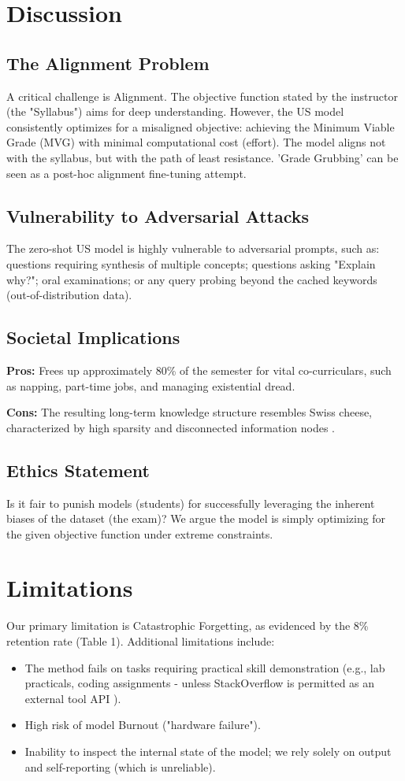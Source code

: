 \documentclass[11pt]{article}
\newcommand{\defitem}[1]{\vspace{0.8em}\noindent\textbf{#1}}
\begin{document}
\section{Discussion}
\subsection{The Alignment Problem}
A critical challenge is Alignment. The objective function stated by the instructor (the "Syllabus") aims for deep understanding. However, the US model consistently optimizes for a misaligned objective: achieving the Minimum Viable Grade (MVG) with minimal computational cost (effort). The model aligns not with the syllabus, but with the path of least resistance. 'Grade Grubbing' can be seen as a post-hoc alignment fine-tuning attempt.

\subsection{Vulnerability to Adversarial Attacks}
The zero-shot US model is highly vulnerable to adversarial prompts, such as: questions requiring synthesis of multiple concepts; questions asking "Explain why?"; oral examinations; or any query probing beyond the cached keywords (out-of-distribution data).

\subsection{Societal Implications}
\defitem{Pros:} Frees up approximately 80\% of the semester for vital co-curriculars, such as napping, part-time jobs, and managing existential dread.

\defitem{Cons:} The resulting long-term knowledge structure resembles Swiss cheese, characterized by high sparsity and disconnected information nodes \cite{panic2022}.

\subsection{Ethics Statement}
Is it fair to punish models (students) for successfully leveraging the inherent biases of the dataset (the exam)? We argue the model is simply optimizing for the given objective function under extreme constraints.

\section{Limitations}
Our primary limitation is Catastrophic Forgetting, as evidenced by the 8\% retention rate (Table 1). Additional limitations include:
\begin{itemize}
    \item The method fails on tasks requiring practical skill demonstration (e.g., lab practicals, coding assignments - unless StackOverflow is permitted as an external tool API \cite{stackoverflow}).
    \item High risk of model Burnout ("hardware failure").
    \item Inability to inspect the internal state of the model; we rely solely on output and self-reporting (which is unreliable).
\end{itemize}
\end{document}
